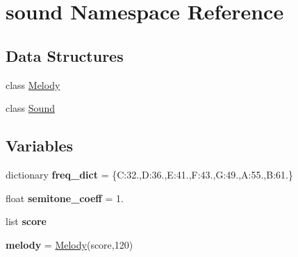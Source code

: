 \hypertarget{namespacesound}{}\section{sound Namespace Reference}
\label{namespacesound}
\subsection*{Data Structures}
\begin{DoxyCompactItemize}
\item 
class \mbox{\hyperlink{classsound_1_1_melody}{Melody}}
\item 
class \mbox{\hyperlink{classsound_1_1_sound}{Sound}}
\end{DoxyCompactItemize}
\subsection*{Variables}
\begin{DoxyCompactItemize}
\item 
\mbox{\label{namespacesound_a33e04a55109645491e99140770b9b33c}} 
dictionary {\bfseries freq\+\_\+dict} = \{\textquotesingle{}C\textquotesingle{}\+:32.,\textquotesingle{}D\textquotesingle{}\+:36.,\textquotesingle{}E\textquotesingle{}\+:41.,\textquotesingle{}F\textquotesingle{}\+:43.,\textquotesingle{}G\textquotesingle{}\+:49.,\textquotesingle{}A\textquotesingle{}\+:55.,\textquotesingle{}B\textquotesingle{}\+:61.\}
\item 
\mbox{\label{namespacesound_a6d5ae5d5a95f36d0d0448a2c603ec47f}} 
float {\bfseries semitone\+\_\+coeff} = 1.
\item 
list {\bfseries score}
\item 
\mbox{\label{namespacesound_a01894a43a61c417313503684c2039eaa}} 
{\bfseries melody} = \mbox{\hyperlink{classsound_1_1_melody}{Melody}}(score,120)
\end{DoxyCompactItemize}


